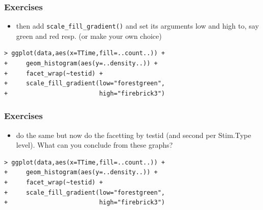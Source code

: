 \documentclass[xcolor={table},c]{beamer}
\begin{document}
\begin{frame}[fragile]\frametitle{Exercises}
  \begin{itemize}
  \item then add \texttt{scale\_fill\_gradient()} and set its arguments low and high to, say green and red resp. (or make your own choice)
  \end{itemize}
\begin{verbatim}
> ggplot(data,aes(x=TTime,fill=..count..)) +
+     geom_histogram(aes(y=..density..)) +
+     facet_wrap(~testid) +
+     scale_fill_gradient(low="forestgreen",
+                         high="firebrick3")
\end{verbatim}
\begin{center}
\end{center}
\end{frame}


\begin{frame}[fragile]\frametitle{Exercises}
  \begin{itemize}
  \item do the same but now do the facetting by testid (and second per Stim.Type level). What can you conclude from these graphs?
  \end{itemize}
\begin{verbatim}
> ggplot(data,aes(x=TTime,fill=..count..)) +
+     geom_histogram(aes(y=..density..)) +
+     facet_wrap(~testid) +
+     scale_fill_gradient(low="forestgreen",
+                         high="firebrick3")
\end{verbatim}
\begin{center}
\end{center}
\end{frame}
\end{document}

